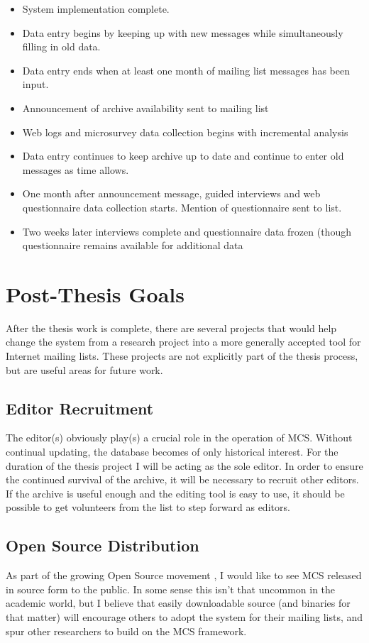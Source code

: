 \begin{itemize}
\item System implementation complete.
\item Data entry begins by keeping up with new messages while simultaneously
  filling in old data.
\item Data entry ends when at least one month of mailing list messages has been 
  input.
\item Announcement of archive availability sent to mailing list
\item Web logs and microsurvey data collection begins with incremental analysis
\item Data entry continues to keep archive up to date and continue to enter old 
  messages as time allows.
\item One month after announcement message, guided interviews and web
  questionnaire data collection starts. Mention of questionnaire sent to list.
\item Two weeks later interviews complete and questionnaire data frozen (though 
  questionnaire remains available for additional data
\end{itemize}


\chapter{Post-Thesis Goals}
\label{cha:post-thesis}
After the thesis work is complete, there are several projects that would help
change the system from a research project into a more generally accepted tool
for Internet mailing lists. These projects are not explicitly part of the
thesis process, but are useful areas for future work.

\section{Editor Recruitment}
The editor(s) obviously play(s) a crucial role in the operation of MCS. Without
continual updating, the database becomes of only historical interest. For the
duration of the thesis project I will be acting as the sole editor. In order to
ensure the continued survival of the archive, it will be necessary to recruit
other editors. If the archive is useful enough and the editing tool is easy to
use, it should be possible to get volunteers from the list to step forward as
editors.

\section{Open Source Distribution}
As part of the growing Open Source movement \cite{open-source-website}, I would
like to see MCS released in source form to the public. In some sense this isn't
that uncommon in the academic world, but I believe that easily downloadable
source (and binaries for that matter) will encourage others to adopt the system
for their mailing lists, and spur other researchers to build on the MCS
framework.

